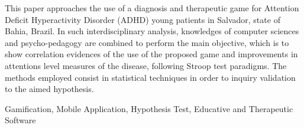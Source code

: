 This paper approaches the use of a diagnosis and therapeutic game for Attention Deficit Hyperactivity Disorder (ADHD) young patients in Salvador, state of Bahia, Brazil. In such interdisciplinary analysis, knowledges of computer sciences and psycho-pedagogy are combined to perform the main objective, which is to show correlation evidences of the use of the proposed game and improvements in attentions level measures of the disease, following Stroop test paradigms. The methods employed consist in statistical techniques in order to inquiry validation to the aimed hypothesis.



\begin{keywords}
Gamification, Mobile Application, Hypothesis Test, Educative and Therapeutic Software
\end{keywords}